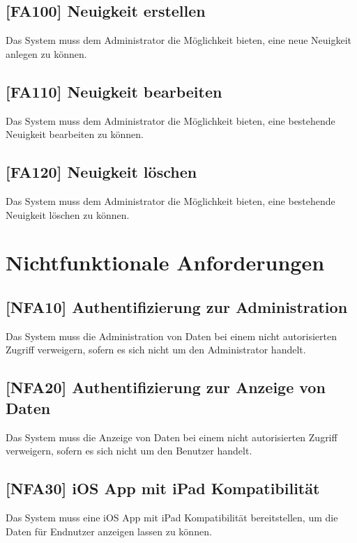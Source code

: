 \subsection{[FA100] Neuigkeit erstellen} \label{fa100}
Das System muss dem Administrator die Möglichkeit bieten, eine neue Neuigkeit anlegen zu können.

\subsection{[FA110] Neuigkeit bearbeiten} \label{fa110}
Das System muss dem Administrator die Möglichkeit bieten, eine bestehende Neuigkeit bearbeiten zu können.

\subsection{[FA120] Neuigkeit löschen} \label{fa120}
Das System muss dem Administrator die Möglichkeit bieten, eine bestehende Neuigkeit löschen zu können.

\newpage

\section{Nichtfunktionale Anforderungen}

\subsection{[NFA10] Authentifizierung zur Administration} \label{nfa10}
Das System muss die Administration von Daten bei einem nicht autorisierten Zugriff verweigern, sofern es sich nicht um den Administrator handelt.

\subsection{[NFA20] Authentifizierung zur Anzeige von Daten} \label{nfa20}
Das System muss die Anzeige von Daten bei einem nicht autorisierten Zugriff verweigern, sofern es sich nicht um den Benutzer handelt.

\subsection{[NFA30] iOS App mit iPad Kompatibilität} \label{nfa30}
Das System muss eine iOS App mit iPad Kompatibilität bereitstellen, um die Daten für Endnutzer anzeigen lassen zu können.
